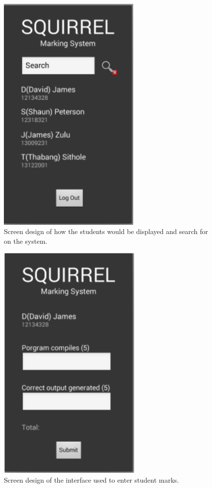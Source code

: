 \documentclass[12pt]{article}
\begin{document}
			\begin{figure}[htbp]
			\centering
			\includegraphics[width=0.7\linewidth, height=12cm]{./Diagrams/mobile_searchForStudent}
			\caption{Screen design of how the students would be displayed and search for on the system.}
			\label{fig:mobile_searchForStudent}
			\end{figure}
	\pagebreak	
	
			\begin{figure}[htbp]
			\centering
			\includegraphics[width=0.7\linewidth, height=12cm]{./Diagrams/mobile_markStudent}
			\caption{Screen design of the interface used to enter student marks.}
			\label{fig:mobile_markStudent}
			\end{figure}
			
\end{document}
